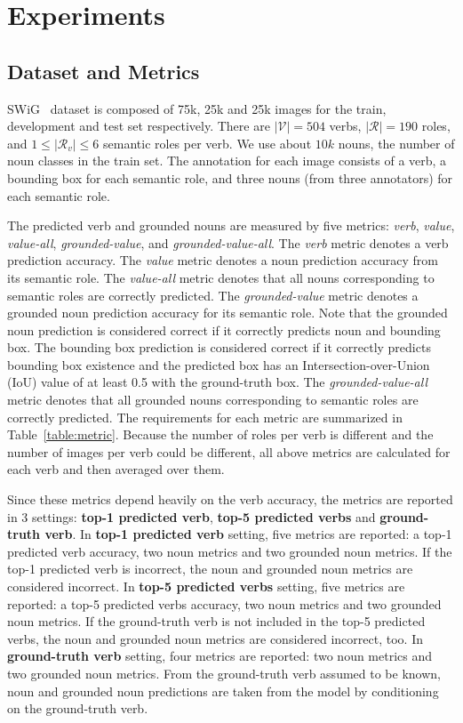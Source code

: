 \section{Experiments}

\subsection{Dataset and Metrics}
\label{exp:data}
SWiG~\cite{pratt2020grounded} dataset is composed of 75k, 25k and 25k images for the train, development and test set respectively.
There are $\vert \mathcal V \vert = 504$ verbs, $\vert \mathcal R \vert = 190$ roles, and $1 \le \vert \mathcal R_v \vert \le 6$ semantic roles per verb.
We use about $10k$ nouns, the number of noun classes in the train set.
The annotation for each image consists of a verb, a bounding box for each semantic role, and three nouns (from three annotators) for each semantic role.

The predicted verb and grounded nouns are measured by five metrics: \textit{verb}, \textit{value}, \textit{value-all}, \textit{grounded-value}, and \textit{grounded-value-all}.
The \textit{verb} metric denotes a verb prediction accuracy.
The \textit{value} metric denotes a noun prediction accuracy from its semantic role.
The \textit{value-all} metric denotes that all nouns corresponding to semantic roles are correctly predicted.
The \textit{grounded-value} metric denotes a grounded noun prediction accuracy for its semantic role.
Note that the grounded noun prediction is considered correct if it correctly predicts noun and bounding box.
The bounding box prediction is considered correct if it correctly predicts bounding box existence and the predicted box has an Intersection-over-Union (IoU) value of at least 0.5 with the ground-truth box.
The \textit{grounded-value-all} metric denotes that all grounded nouns corresponding to semantic roles are correctly predicted. 
The requirements for each metric are summarized in Table~\ref{table:metric}.
Because the number of roles per verb is different and the number of images per verb could be different, all above metrics are calculated for each verb and then averaged over them. 

Since these metrics depend heavily on the verb accuracy, the metrics are reported in 3 settings: \textbf{top-1 predicted verb}, \textbf{top-5 predicted verbs} and \textbf{ground-truth verb}.
In \textbf{top-1 predicted verb} setting, five metrics are reported: a top-1 predicted verb accuracy, two noun metrics and two grounded noun metrics.
If the top-1 predicted verb is incorrect, the noun and grounded noun metrics are considered incorrect.
In \textbf{top-5 predicted verbs} setting, five metrics are reported: a top-5 predicted verbs accuracy, two noun metrics and two grounded noun metrics.
If the ground-truth verb is not included in the top-5 predicted verbs, the noun and grounded noun metrics are
considered incorrect, too.
In \textbf{ground-truth verb} setting, four metrics are reported: two noun metrics and two grounded noun metrics.
From the ground-truth verb assumed to be known, noun and grounded noun predictions are taken from the model by conditioning on the ground-truth verb.

